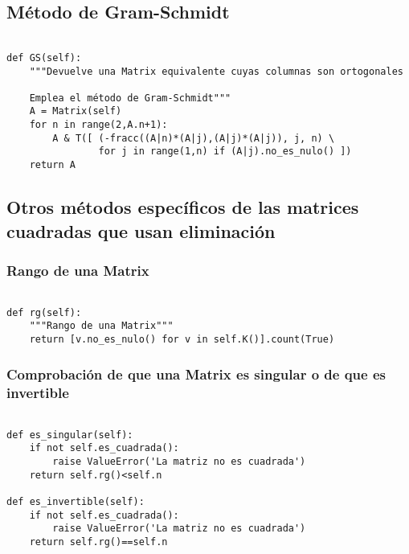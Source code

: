 \documentclass[11pt]{report}
\begin{document}
\subsection{Método de Gram-Schmidt}
\label{sec:org8d3294d}

\begin{verbatim}

def GS(self):
    """Devuelve una Matrix equivalente cuyas columnas son ortogonales

    Emplea el método de Gram-Schmidt"""
    A = Matrix(self)
    for n in range(2,A.n+1):
        A & T([ (-fracc((A|n)*(A|j),(A|j)*(A|j)), j, n) \
                for j in range(1,n) if (A|j).no_es_nulo() ])
    return A

\end{verbatim}

\subsection{Otros métodos específicos de las matrices cuadradas que usan eliminación}
\label{sec:org6e99d3c}
\subsubsection{Rango de una Matrix}
\label{sec:org37c60e3}

\begin{verbatim}

def rg(self):
    """Rango de una Matrix"""
    return [v.no_es_nulo() for v in self.K()].count(True)

\end{verbatim}

\subsubsection{Comprobación de que una Matrix es singular o de que es invertible}
\label{sec:org6231ca7}

\begin{verbatim}

def es_singular(self):
    if not self.es_cuadrada():
        raise ValueError('La matriz no es cuadrada')
    return self.rg()<self.n
  
def es_invertible(self):
    if not self.es_cuadrada():
        raise ValueError('La matriz no es cuadrada')
    return self.rg()==self.n
  
\end{verbatim}
\end{document}
